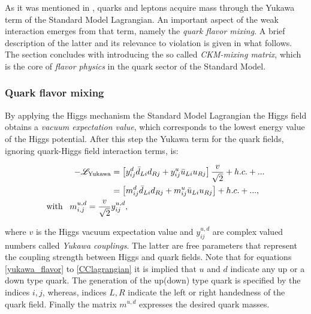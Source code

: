 As it was mentioned in , quarks and leptons acquire mass through the Yukawa term
of the Standard Model Lagrangian. An important aspect of the weak interaction emerges from that term,
namely the {\it quark flavor mixing}. A brief description of the latter and its relevance to \CP violation
is given in what follows. The section concludes with introducing the so called {\it CKM-mixing matrix},
which is the core of {\it flavor physics} in the quark sector of the Standard Model.

\subsubsection{Quark flavor mixing}
By applying the Higgs mechanism \cite{PhysRevLett.13.321,PhysRevLett.13.508} the Standard Model Lagrangian
the Higgs field obtains a {\it vacuum expectation value}, which corresponds to the lowest energy value of the Higgs
potential. After this step the Yukawa term for the quark fields, ignoring quark-Higgs field interaction terms, is:

\begin{subequations}
\label{yukawa_flavor}
\centering
  \begin{align}
  -\mathscr{L}_{\text{Yukawa}} &= \left[ y_{ij}^d \bar{d}_{Li} d_{Rj} + y_{ij}^u \bar{u}_{Li} u_{Rj} \right] \frac{v}{\sqrt{2}} + h.c. + ...  \\
                               &= \left[ m_{ij}^d \bar{d}_{Li} d_{Rj} + m_{ij}^u \bar{u}_{Li} u_{Rj} \right] + h.c. + ...,  \\
                               \text{with} \;\;\; m^{u,d}_{i,j} = \frac{v}{\sqrt{2}} & y_{ij}^{u,d}, \nonumber
  \end{align}
\end{subequations}

\noindent where $v$ is the Higgs vacuum expectation value and $y_{ij}^{u,d}$ are complex valued numbers called {\it Yukawa couplings}.
The latter are free parameters that represent the coupling strength between Higgs and quark fields.
Note that for equations \ref{yukawa_flavor} to \ref{CClagrangian} it is implied that $u$ and $d$ indicate
any up or a down type quark. The generation of the up(down) type quark is specified by the indices $i,j$,
whereas, indices $L,R$ indicate the left or right handedness of the quark field.
Finally the matrix $m^{u,d}$ expresses the desired quark masses.

